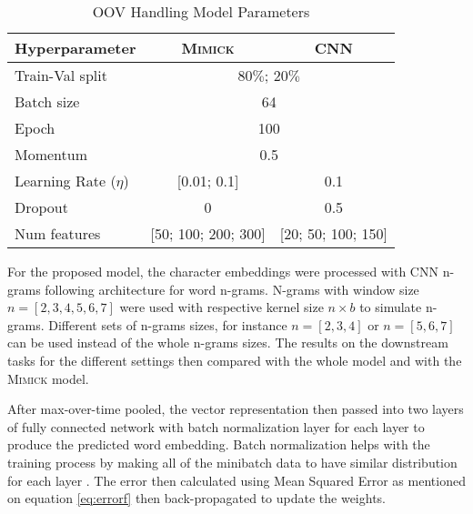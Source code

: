         \begin{table}[]
            \centering
            \caption{OOV Handling Model Parameters}
            \label{tab:hyperparameter}
            \begin{tabular}{@{}lcc@{}}
                \toprule
                \textbf{Hyperparameter} & \multicolumn{1}{c}{\textbf{\textsc{Mimick}}} & \multicolumn{1}{c}{\textbf{CNN}} \\ \midrule
                Train-Val split & \multicolumn{2}{c}{$80\%$; $20\%$}\\
                Batch size & \multicolumn{2}{c}{64} \\
                Epoch & \multicolumn{2}{c}{100} \\
                Momentum & \multicolumn{2}{c}{0.5} \\
                Learning Rate ($\eta$) & [0.01; 0.1] & 0.1 \\
                Dropout & 0 & 0.5 \\
                Num features & [50; 100; 200; 300] & [20; 50; 100; 150] \\ \bottomrule
            \end{tabular}
        \end{table}

        For the proposed model, the character embeddings were
        processed with CNN n-grams following
        \cite{convolutional2014kim} architecture for word n-grams.
        N-grams with window size $n = [2, 3, 4, 5, 6, 7]$ were used
        with respective kernel size $n \times b$ to simulate n-grams.
        Different sets of n-grams sizes, for instance $n = [2, 3, 4]$
        or $n = [5, 6, 7]$ can be used instead of the whole n-grams
        sizes. The results on the downstream tasks for the different
        settings then compared with the whole model and with the
        \textsc{Mimick} model.
        
        After max-over-time pooled, the vector representation then
        passed into two layers of fully connected network with batch
        normalization layer for each layer to produce the predicted
        word embedding. Batch normalization helps with the training
        process by making all of the minibatch data to have similar
        distribution for each layer
        \citep{batchnorm:DBLP:journals/corr/IoffeS15}. The error then
        calculated using Mean Squared Error as mentioned on equation
        \ref{eq:errorf} then back-propagated to update the weights.

